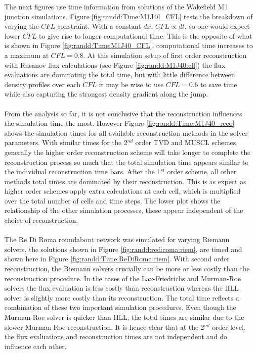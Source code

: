 	\noindent The next figures use time information from solutions of the Wakefield M1 junction simulations. Figure \ref{fig:randd:Time:M1J40_CFL} tests the breakdown of varying the $CFL$ constraint. With a constant $dx$, $CFL\propto dt$, so one would expect lower $CFL$ to give rise to longer computational time. This is the opposite of what is shown in Figure \ref{fig:randd:Time:M1J40_CFL}, computational time increases to a maximum at $CFL=0.8$. At this simulation setup of first order reconstruction with Rusanov flux calculations (see Figure \ref{fig:randd:M1J40:cfl}) the flux evaluations are dominating the total time, but with little difference between density profiles over each $CFL$ it may be wise to use $CFL=0.6$ to save time while also capturing the strongest density gradient along the jump.
	\\ \\
	From the analysis so far, it is not conclusive that the reconstruction influences the simulation time the most. However Figure \ref{fig:randd:Time:M1J40_reco} shows the simulation times for all available reconstruction methods in the solver parameters. With similar times for the 2$^{nd}$ order TVD and MUSCL schemes, generally the higher order reconstruction scheme will take longer to complete the reconstruction process so much that the total simulation time appears similar to the individual reconstruction time bars. After the 1$^{st}$ order scheme, all other methods total times are dominated by their reconstruction. This is as expect as higher order schemes apply extra calculations at each cell, which is multiplied over the total number of cells and time steps. The lower plot shows the relationship of the other simulation processes, these appear independent of the choice of reconstruction.
	\\ \\
	The Re Di Roma roundabout network was simulated for varying Riemann solvers, the solutions shown in Figure \ref{fig:randd:rediroma:riem}, are timed and shown here in Figure \ref{fig:randd:Time:ReDiRoma:riem}. With second order reconstruction, the Riemann solvers crucially can be more or less costly than the reconstruction procedure. In the cases of the Lax-Friedrichs and Murman-Roe solvers the flux evaluation is less costly than reconstruction whereas the HLL solver is slightly more costly than its reconstruction. The total time reflects a combination of these two important simulation procedures. Even though the Murman-Roe solver is quicker than HLL, the total times are similar due to the slower Murman-Roe reconstruction. It is hence clear that at the 2$^{nd}$ order level, the flux evaluations and reconstruction times are not independent and do influence each other. 
